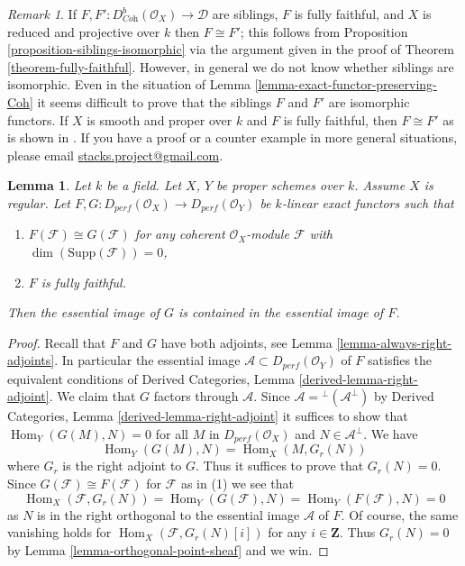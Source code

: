 \documentclass{stacks-project}
\theoremstyle{plain}
\newtheorem{lemma}[subsection]{Lemma}
\theoremstyle{definition}
\theoremstyle{remark}
\newtheorem{remark}[subsection]{Remark}
\numberwithin{equation}{subsection}
\def\Hom{\mathop{\mathrm{Hom}}\nolimits}
\begin{document}
\begin{remark}
\label{remark-difficult}
If $F, F' : D^b_{\textit{Coh}}(\mathcal{O}_X) \to \mathcal{D}$ are siblings, $F$
is fully faithful, and $X$ is reduced and projective over $k$ then
$F \cong F'$; this follows from
Proposition \ref{proposition-siblings-isomorphic} via the argument
given in the proof of Theorem \ref{theorem-fully-faithful}.
However, in general we do not know whether siblings are isomorphic.
Even in the situation of Lemma \ref{lemma-exact-functor-preserving-Coh}
it seems difficult to prove that the siblings $F$ and $F'$
are isomorphic functors. If $X$ is smooth and proper over $k$
and $F$ is fully faithful, then $F \cong F'$ as is shown in
\cite{Noah}.
If you have a proof or a counter example in more general situations,
please email
\href{mailto:stacks.project@gmail.com}{stacks.project@gmail.com}.
\end{remark}

\begin{lemma}
\label{lemma-two-functors-pre}
Let $k$ be a field. Let $X$, $Y$ be proper schemes over $k$. Assume
$X$ is regular. Let
$F, G : D_{perf}(\mathcal{O}_X) \to D_{perf}(\mathcal{O}_Y)$
be $k$-linear exact functors such that
\begin{enumerate}
\item $F(\mathcal{F}) \cong G(\mathcal{F})$ for any coherent
$\mathcal{O}_X$-module $\mathcal{F}$ with $\dim(\text{Supp}(\mathcal{F})) = 0$,
\item $F$ is fully faithful.
\end{enumerate}
Then the essential image of $G$ is contained in the essential
image of $F$.
\end{lemma}

\begin{proof}
Recall that $F$ and $G$ have both adjoints, see
Lemma \ref{lemma-always-right-adjoints}. In particular
the essential image $\mathcal{A} \subset D_{perf}(\mathcal{O}_Y)$ of $F$
satisfies the equivalent conditions of
Derived Categories, Lemma \ref{derived-lemma-right-adjoint}.
We claim that $G$ factors through $\mathcal{A}$.
Since $\mathcal{A} = {}^\perp(\mathcal{A}^\perp)$ by
Derived Categories, Lemma \ref{derived-lemma-right-adjoint}
it suffices to show that $\Hom_Y(G(M), N) = 0$ for
all $M$ in $D_{perf}(\mathcal{O}_X)$ and $N \in \mathcal{A}^\perp$.
We have
$$
\Hom_Y(G(M), N) = \Hom_X(M, G_r(N))
$$
where $G_r$ is the right adjoint to $G$. Thus it suffices to prove
that $G_r(N) = 0$. Since
$G(\mathcal{F}) \cong F(\mathcal{F})$ for $\mathcal{F}$ as in (1)
we see that
$$
\Hom_X(\mathcal{F}, G_r(N)) =
\Hom_Y(G(\mathcal{F}), N) =
\Hom_Y(F(\mathcal{F}), N) = 0
$$
as $N$ is in the right orthogonal to the essential image $\mathcal{A}$ of $F$.
Of course, the same vanishing holds for $\Hom_X(\mathcal{F}, G_r(N)[i])$
for any $i \in \mathbf{Z}$. Thus $G_r(N) = 0$ by
Lemma \ref{lemma-orthogonal-point-sheaf} and we win.
\end{proof}
\end{document}
